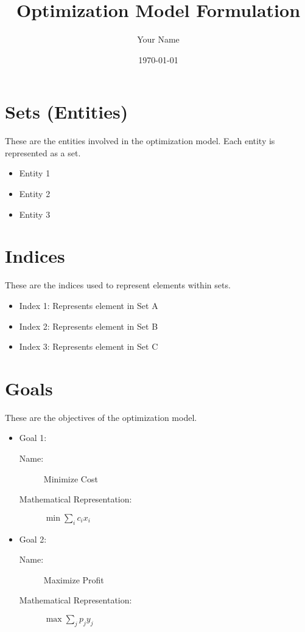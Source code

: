 \documentclass{article}
\title{Optimization Model Formulation}
\author{Your Name}
\date{\today}
\begin{document}
\maketitle

\tableofcontents

\section{Sets (Entities)}
These are the entities involved in the optimization model. Each entity is represented as a set.
\begin{itemize}
    \item Entity 1
    \item Entity 2
    \item Entity 3
\end{itemize}

\section{Indices}
These are the indices used to represent elements within sets.
\begin{itemize}
    \item Index 1: Represents element in Set A
    \item Index 2: Represents element in Set B
    \item Index 3: Represents element in Set C
\end{itemize}

\section{Goals}
These are the objectives of the optimization model.
\begin{itemize}
    \item Goal 1: 
        \begin{description}
            \item[Name:] Minimize Cost
            \item[Mathematical Representation:] $\min \sum_{i} c_i x_i$
        \end{description}
    \item Goal 2:
        \begin{description}
            \item[Name:] Maximize Profit
            \item[Mathematical Representation:] $\max \sum_{j} p_j y_j$
        \end{description}
\end{itemize}
\end{document}
